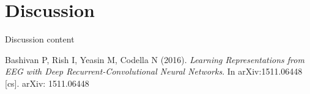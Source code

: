 \documentclass{article}
\begin{document}
\section{Discussion}
Discussion content

\begin{thebibliography}{9}
	Bashivan  P,  Rish  I,  Yeasin  M,  Codella  N  (2016). 
	\textit{Learning  Representations from  EEG with  Deep Recurrent-Convolutional  Neural Networks}. 
	In arXiv:1511.06448 [cs]. arXiv: 1511.06448
\end{thebibliography}
\end{document}
